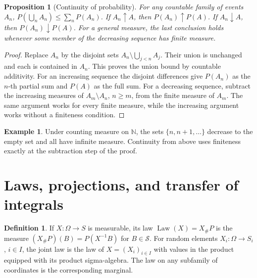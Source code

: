 \documentclass[11pt,oneside,openany]{book}
\theoremstyle{plain}
\newtheorem{proposition}[theorem]{Proposition}
\theoremstyle{definition}
\newtheorem{definition}[theorem]{Definition}
\newtheorem{example}[theorem]{Example}
\theoremstyle{remark}
\begin{document}
\begin{proposition}[Continuity of probability]
\label{thm:prob-continuity}
For any countable family of events \(A_n\), \(P(\bigcup_n A_n)\le
\sum_nP(A_n)\). If \(A_n\uparrow A\), then \(P(A_n)\uparrow P(A)\).
If \(A_n\downarrow A\), then \(P(A_n)\downarrow P(A)\). For a general
measure, the last conclusion holds whenever some member of the decreasing
sequence has finite measure.
\end{proposition}
\begin{proof}
Replace \(A_n\) by the disjoint sets \(A_n\setminus\bigcup_{j<n}A_j\).
Their union is unchanged and each is contained in \(A_n\). This proves the
union bound by countable additivity. For an increasing sequence the
disjoint differences give \(P(A_n)\) as the \(n\)-th partial sum and
\(P(A)\) as the full sum. For a decreasing sequence, subtract the
increasing measures of \(A_m\setminus A_n\), \(n\ge m\), from the
finite measure of \(A_m\). The same argument works for every finite
measure, while the increasing argument works without a finiteness condition.
\end{proof}

\begin{example}
Under counting measure on \(\mathbb N\), the sets
\(\{n,n+1,\ldots\}\) decrease to the empty set and all have infinite
measure. Continuity from above uses finiteness exactly at the subtraction
step of the proof.
\end{example}

\section{Laws, projections, and transfer of integrals}
\label{p01-02}

\begin{definition}
If \(X\colon\Omega\to S\) is measurable, its law
\(\operatorname{Law}(X)=X_\#P\) is the measure
\((X_\#P)(B)=P(X^{-1}B)\) for \(B\in\mathcal S\). For random elements
\(X_i\colon\Omega\to S_i\), \(i\in I\), the joint law is the law of
\(X=(X_i)_{i\in I}\) with values in the product equipped with its
product sigma-algebra. The law on any subfamily of coordinates is the
corresponding marginal.
\end{definition}
\end{document}
